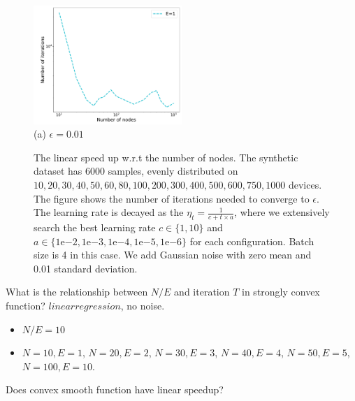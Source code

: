 \begin{figure}
\centering
\includegraphics[width=0.5\textwidth]{fig/synthetic_linear_regression_noise1e-02-epsilon01008-logTrue-epoch-1-b4-adapt0.pdf} \\ 
(a) $\epsilon=0.01$ \\
	\caption{The linear speed up w.r.t the number of nodes. The synthetic dataset has $6000$ samples, evenly distributed on $10, 20, 30, 40, 50, 60, 80, 100, 200, 300, 400, 500, 600, 750, 1000$ devices. The figure shows the number of iterations needed to converge to $\epsilon$. The learning rate is decayed as the $\eta_t = \frac{1}{c + t \times a}$, where we extensively search the best learning rate $c \in \{1, 10\}$ and $a \in \{1\mathrm{e}{-2}, 1\mathrm{e}{-3}, 1\mathrm{e}{-4}, 1\mathrm{e}{-5}, 1\mathrm{e}{-6}\}$ for each configuration. Batch size is 4 in this case. 
	We add Gaussian noise with zero mean and 0.01 standard deviation.}
\end{figure}


What is the relationship between $N/E$ and iteration $T$ in strongly convex function? $linear regression$, no noise. 
\begin{itemize}
	\item $N/E = 10$
	\item $N=10, E=1$, $N=20, E=2$, $N=30, E=3$, $N=40, E=4$, $N=50, E=5$, $N=100, E=10$.
\end{itemize} 


Does convex smooth function have linear speedup?

